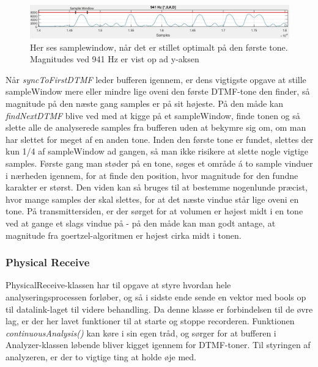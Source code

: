 \begin{figure}[h]
\centering
\includegraphics[scale=0.5]{Billeder/Samplewindow.PNG}
\caption{Her ses samplewindow, når det er stillet optimalt på den første tone. Magnitudes ved 941 Hz er vist op ad y-aksen}
\label{fig:Samplewindow}
\end{figure}
Når \textit{syncToFirstDTMF} leder bufferen igennem, er dens vigtigste opgave at stille sampleWindow mere eller mindre lige oveni den første DTMF-tone den finder, så magnitude på den næste gang samples er på sit højeste. På den måde kan \textit{findNextDTMF} blive ved med at kigge på et sampleWindow, finde tonen og så slette alle de analyserede samples fra bufferen uden at bekymre sig om, om man har slettet for meget af en anden tone. Inden den første tone er fundet, slettes der kun 1/4 af sampleWindow ad gangen, så man ikke risikere at slette nogle vigtige samples. Første gang man støder på en tone, søges et område á to sample vinduer i nærheden igennem, for at finde den position, hvor magnitude for den fundne karakter er størst. Den viden kan så bruges til at bestemme nogenlunde præcist, hvor mange samples der skal slettes, for at det næste vindue står lige oveni en tone. På transmittersiden, er der sørget for at volumen er højest midt i en tone ved at gange et slags vindue på - på den måde kan man godt antage, at magnitude fra goertzel-algoritmen er højest cirka midt i tonen.

\subsubsection{Physical Receive}

PhysicalReceive-klassen har til opgave at styre hvordan hele analyseringsprocessen forløber, og så i sidste ende sende en vektor med bools op til datalink-laget til videre behandling. Da denne klasse er forbindelsen til de øvre lag, er der her lavet funktioner til at starte og stoppe recorderen. Funktionen \textit{continuousAnalysis()} kan køre i sin egen tråd, og sørger for at bufferen i Analyzer-klassen løbende bliver kigget igennem for DTMF-toner. Til styringen af analyzeren, er der to vigtige ting at holde øje med.

